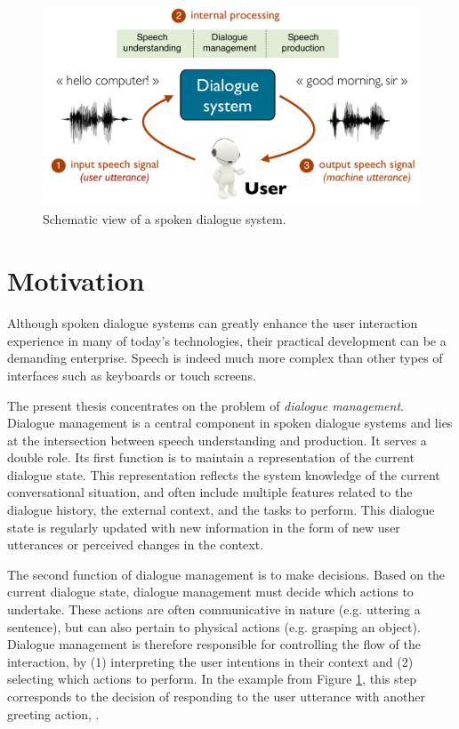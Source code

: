 \begin{figure}[h]
\center
\includegraphics[scale=0.46]{imgs/basicsds.pdf}
\caption{Schematic view of a spoken dialogue system.}
\label{fig:basicsds}
\end{figure}

\section{Motivation}

Although spoken dialogue systems can greatly enhance the user interaction experience in many of today's technologies, their practical development can be a demanding enterprise. Speech is indeed much more complex than other types of interfaces such as keyboards or touch screens.  

The present thesis concentrates on the problem of \textit{dialogue management}.  Dialogue management is a central component in spoken dialogue systems and lies at the intersection between speech understanding and production.  It serves a double role. Its first function is to maintain a representation of the current dialogue state. This representation reflects the system knowledge of the current conversational situation, and often include multiple features related to the dialogue history, the external context, and the tasks to perform.  This dialogue state is regularly updated with new information in the form of new user utterances or perceived changes in the context. 

The second function of dialogue management is to make decisions.  Based on the current dialogue state, dialogue management must decide which actions to undertake. These actions are often communicative in nature (e.g. uttering a sentence), but can also pertain to physical actions (e.g. grasping an object).  Dialogue management is therefore responsible for controlling the flow of the interaction, by (1) interpreting the user intentions in their context and (2) selecting which actions to perform. In the example from Figure \ref{fig:basicsds}, this step corresponds to the decision of responding to the user utterance  with another greeting action, . 

